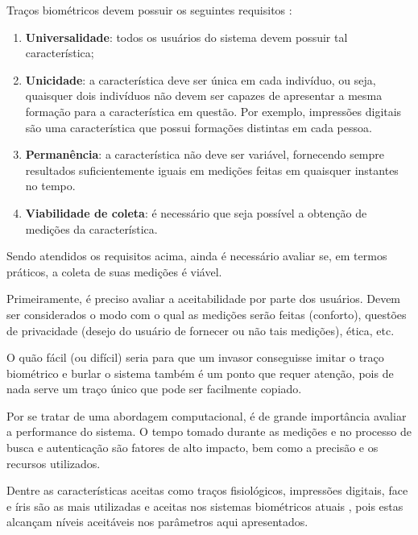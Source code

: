 Traços biométricos devem possuir os seguintes requisitos \cite{an_introduction_biometric_recognition}:

\begin{enumerate}
	\item \textbf{Universalidade}: todos os usuários do sistema devem possuir tal característica;
	\item \textbf{Unicidade}: a característica deve ser única em cada indivíduo, ou seja, quaisquer dois indivíduos não devem ser capazes de apresentar a mesma formação para a característica em questão. Por exemplo, impressões digitais são uma característica que possui formações distintas em cada pessoa.
	\item \textbf{Permanência}: a característica não deve ser variável, fornecendo sempre resultados suficientemente iguais em medições feitas em quaisquer instantes no tempo.
	\item \textbf{Viabilidade de coleta}: é necessário que seja possível a obtenção de medições da característica. 
\end{enumerate}

Sendo atendidos os requisitos acima, ainda é necessário avaliar se, em termos práticos, a coleta de suas medições é viável.

Primeiramente, é preciso avaliar a aceitabilidade por parte dos usuários. Devem ser considerados o modo com o qual as medições serão feitas (conforto), questões de privacidade (desejo do usuário de fornecer ou não tais medições), ética, etc.

O quão fácil (ou difícil) seria para que um invasor conseguisse imitar o traço biométrico e burlar o sistema também é um ponto que requer atenção, pois de nada serve um traço único que pode ser facilmente copiado.

Por se tratar de uma abordagem computacional, é de grande importância avaliar a performance do sistema. O tempo tomado durante as medições e no processo de busca e autenticação são fatores de alto impacto, bem como a precisão e os recursos utilizados.

Dentre as características aceitas como traços fisiológicos, impressões digitais, face e íris são as mais utilizadas e aceitas nos sistemas biométricos atuais \cite{guidelines_practices}, pois estas alcançam níveis aceitáveis nos parâmetros aqui apresentados.

